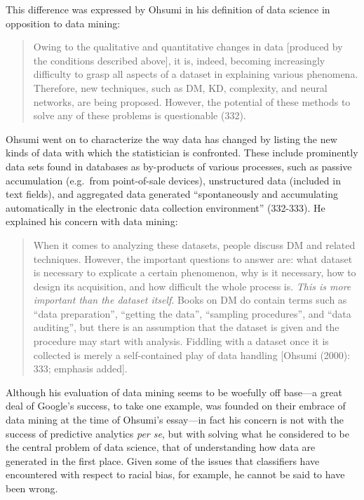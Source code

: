 \documentclass[
  letterpaper,
]{report}
\begin{document}
This difference was expressed by Ohsumi in his definition of data
science in opposition to data mining:

\begin{quote}
Owing to the qualitative and quantitative changes in data {[}produced by
the conditions described above{]}, it is, indeed, becoming increasingly
difficulty to grasp all aspects of a dataset in explaining various
phenomena. Therefore, new techniques, such as DM, KD, complexity, and
neural networks, are being proposed. However, the potential of these
methods to solve any of these problems is questionable (332).
\end{quote}

Ohsumi went on to characterize the way data has changed by listing the
new kinds of data with which the statistician is confronted. These
include prominently data sets found in databases as by-products of
various processes, such as passive accumulation (e.g.~from point-of-sale
devices), unstructured data (included in text fields), and aggregated
data generated ``spontaneously and accumulating automatically in the
electronic data collection environment'' (332-333). He explained his
concern with data mining:

\begin{quote}
When it comes to analyzing these datasets, people discuss DM and related
techniques. However, the important questions to answer are: what dataset
is necessary to explicate a certain phenomenon, why is it necessary, how
to design its acquisition, and how difficult the whole process is.
\emph{This is more important than the dataset itself}. Books on DM do
contain terms such as ``data preparation'', ``getting the data'',
``sampling procedures'', and ``data auditing'', but there is an
assumption that the dataset is given and the procedure may start with
analysis. Fiddling with a dataset once it is collected is merely a
self-contained play of data handling {[}Ohsumi (2000): 333; emphasis
added{]}.
\end{quote}

Although his evaluation of data mining seems to be woefully off base---a
great deal of Google's success, to take one example, was founded on
their embrace of data mining at the time of Ohsumi's essay---in fact his
concern is not with the success of predictive analytics \emph{per se},
but with solving what he considered to be the central problem of data
science, that of understanding how data are generated in the first
place. Given some of the issues that classifiers have encountered with
respect to racial bias, for example, he cannot be said to have been
wrong.
\end{document}
